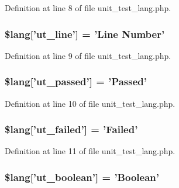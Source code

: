 Definition at line 8 of file unit\-\_\-test\-\_\-lang.\-php.

\hypertarget{unit__test__lang_8php_aee353ee43b856ce5ec790a20ea15ef92}{
\subsubsection[{\$lang}]{\setlength{\rightskip}{0pt plus 5cm}\$lang\mbox{[}'ut\-\_\-line'\mbox{]} = 'Line Number'}}\label{unit__test__lang_8php_aee353ee43b856ce5ec790a20ea15ef92}


Definition at line 9 of file unit\-\_\-test\-\_\-lang.\-php.

\hypertarget{unit__test__lang_8php_a7b1c16415de1186d294aa317d0bc864f}{
\subsubsection[{\$lang}]{\setlength{\rightskip}{0pt plus 5cm}\$lang\mbox{[}'ut\-\_\-passed'\mbox{]} = 'Passed'}}\label{unit__test__lang_8php_a7b1c16415de1186d294aa317d0bc864f}


Definition at line 10 of file unit\-\_\-test\-\_\-lang.\-php.

\hypertarget{unit__test__lang_8php_a3aefecf7c98bec69d7957cbb673a3f49}{
\subsubsection[{\$lang}]{\setlength{\rightskip}{0pt plus 5cm}\$lang\mbox{[}'ut\-\_\-failed'\mbox{]} = 'Failed'}}\label{unit__test__lang_8php_a3aefecf7c98bec69d7957cbb673a3f49}


Definition at line 11 of file unit\-\_\-test\-\_\-lang.\-php.

\hypertarget{unit__test__lang_8php_aa274bf9371c9922bc530135b4dc45943}{
\subsubsection[{\$lang}]{\setlength{\rightskip}{0pt plus 5cm}\$lang\mbox{[}'ut\-\_\-boolean'\mbox{]} = 'Boolean'}}\label{unit__test__lang_8php_aa274bf9371c9922bc530135b4dc45943}


